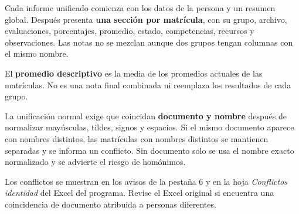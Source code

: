 \documentclass[11pt,letterpaper,oneside]{report}
\begin{document}
Cada informe unificado comienza con los datos de la persona y un resumen global. Después presenta \textbf{una sección por matrícula}, con su grupo, archivo, evaluaciones, porcentajes, promedio, estado, competencias, recursos y observaciones. Las notas no se mezclan aunque dos grupos tengan columnas con el mismo nombre.

El \textbf{promedio descriptivo} es la media de los promedios actuales de las matrículas. No es una nota final combinada ni reemplaza los resultados de cada grupo.

\begin{atencion}
La unificación normal exige que coincidan \textbf{documento y nombre} después de normalizar mayúsculas, tildes, signos y espacios. Si el mismo documento aparece con nombres distintos, las matrículas con nombres distintos se mantienen separadas y se informa un conflicto. Sin documento solo se usa el nombre exacto normalizado y se advierte el riesgo de homónimos.
\end{atencion}

Los conflictos se muestran en los avisos de la pestaña 6 y en la hoja \emph{Conflictos identidad} del Excel del programa. Revise el Excel original si encuentra una coincidencia de documento atribuida a personas diferentes.
\end{document}
